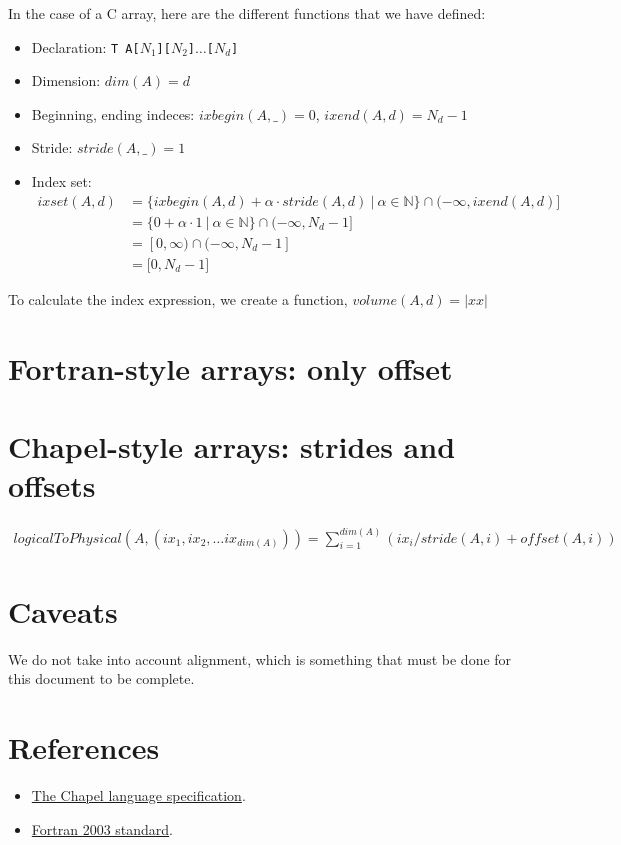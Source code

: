 \documentclass{article}
\newcommand{\naturals}{\mathbb{N}}
\begin{document}
In the case of a C array, here are the different functions that we have defined:
\begin{itemize}
    \renewcommand\labelitemi{--}
    \item Declaration: \texttt{T A[$N_1$][$N_2$]$\dots$[$N_d$]}
    \item Dimension: $dim(A) = d$
    \item Beginning, ending indeces: $ixbegin(A, \_) = 0$, $ixend(A, d) = N_d - 1$
    \item Stride: $stride(A, \_) = 1$
    \item Index set: 
        \begin{align*}
            ixset(A, d) &= \{ ixbegin(A, d) + \alpha \cdot stride(A, d)~\vert~ \alpha \in \naturals \} \cap (-\infty, ixend(A, d) ] \\
                        &= \{ 0 + \alpha \cdot 1~\vert~\alpha \in \naturals \} \cap (-\infty, N_d - 1 \rbrack \\
                        &= [0, \infty) \cap (-\infty, N_d - 1]\\
                        &= \lbrack 0, N_d - 1 \rbrack
        \end{align*}
\end{itemize}

To calculate the index expression, we create a function, $volume(A, d) = |xx|$

\section{Fortran-style arrays: only offset}

\section{Chapel-style arrays: strides and offsets}

\begin{align*}
    logicalToPhysical(A, (ix_1, ix_2, \dots ix_{dim(A)})) = \sum_{i=1}^{dim(A)} (ix_i / stride(A, i) + offset(A, i)) 
\end{align*}



\section{Caveats}
We do not take into account alignment, which is something that must be done
for this document to be complete.

\section{References}
\begin{itemize}
    \item \href{https://chapel-lang.org/docs/1.13/_downloads/chapelLanguageSpec.pdf}{The Chapel language specification}.
    \item \href{http://www.j3-fortran.org/doc/year/04/04-007.pdf}{Fortran 2003 standard}.
\end{itemize}
\end{document}
